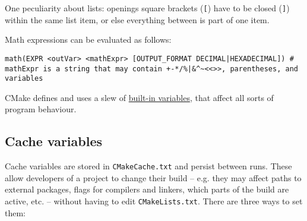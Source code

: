 \documentclass[8pt, table, xcdraw]{article}%
\begin{document}
One peculiarity about lists: openings square brackets (\lstinline{[}) have to be closed (\lstinline{]}) within the same list item, or else everything between is part of one item.

Math expressions can be evaluated as follows:

\begin{lstlisting}
math(EXPR <outVar> <mathExpr> [OUTPUT_FORMAT DECIMAL|HEXADECIMAL]) # mathExpr is a string that may contain +-*/%|&^~<<>>, parentheses, and variables
\end{lstlisting}

CMake defines and uses a slew of \href{https://cmake.org/cmake/help/latest/manual/cmake-variables.7.html}{built-in variables}, that affect all sorts of program behaviour.

\subsection{Cache variables} \label{cache_variables}

Cache variables are stored in \lstinline{CMakeCache.txt} and persist between runs. These allow developers of a project to change their build -- e.g. they may affect paths to external packages, flags for compilers and linkers, which parts of the build are active, etc. -- without having to edit \lstinline{CMakeLists.txt}. There are three ways to set them:
\end{document}
